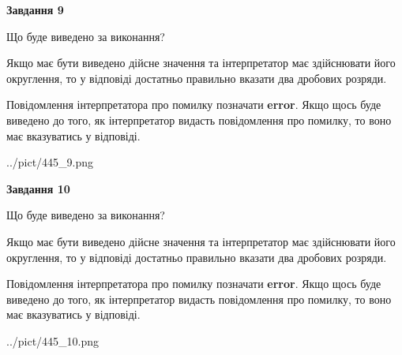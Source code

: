 \documentclass[12pt, ukrainian]{article}
\begin{document}
{\begin {Large}
{\begin {center}\textbf{Завдання 9}\end {center}}\par
Що буде виведено за виконання? \par

Якщо має бути виведено дійсне значення та інтерпретатор має здійснювати його округлення, 
то у відповіді достатньо правильно вказати два дробових розряди.

Повідомлення інтерпретатора про помилку позначати \textbf{error}.
Якщо щось буде виведено до того, як інтерпретатор видасть повідомлення про помилку, 
то воно має вказуватись у відповіді. \par

\begin{center}
	{../pict/445_9.png}
\end{center}
\newpage

{\begin {center}\textbf{Завдання 10}\end {center}}\par
Що буде виведено за виконання? \par

Якщо має бути виведено дійсне значення та інтерпретатор має здійснювати його округлення, 
то у відповіді достатньо правильно вказати два дробових розряди.

Повідомлення інтерпретатора про помилку позначати \textbf{error}.
Якщо щось буде виведено до того, як інтерпретатор видасть повідомлення про помилку, 
то воно має вказуватись у відповіді. \par

\begin{center}
	{../pict/445_10.png}
\end{center}
\newpage

\end {Large}}
\end{document}
